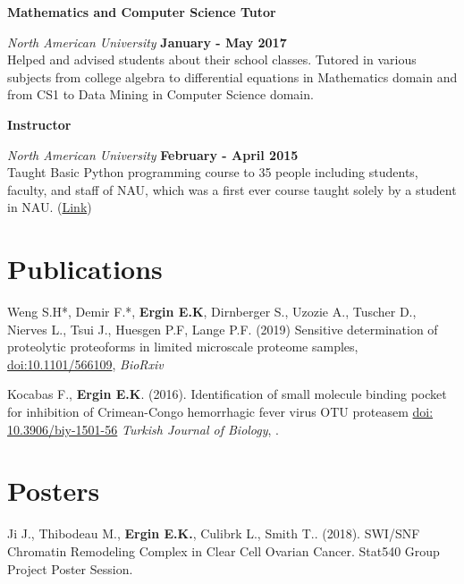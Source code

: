 \documentclass[margin,line]{res}
\begin{document}
\begin{resume}
{\bf Mathematics and Computer Science Tutor}
\vspace{-.1cm}

{\em North American University} \hfill {\bf January - May 2017}\\
Helped and advised students about their school classes. Tutored in various subjects from college algebra to differential equations in Mathematics domain and from CS1 to Data Mining in Computer Science domain.

{\bf Instructor}
\vspace{-.1cm}

{\em North American University} \hfill {\bf February - April 2015}\\
Taught Basic Python programming course to 35 people including students, faculty, and staff of NAU, which was a first ever course taught solely by a student in NAU. (\href{https://github.com/NAU-Python-Class/Py101-Spring-15}{Link})


\section{\sc Publications}
Weng S.H*, Demir F.*, {\bf Ergin E.K}, Dirnberger S., Uzozie A., Tuscher D., Nierves L., Tsui J., Huesgen P.F, Lange P.F. (2019) Sensitive determination of proteolytic proteoforms in limited microscale proteome samples, \href{https://doi.org/10.1101/566109}{doi:10.1101/566109}, {\em BioRxiv}

Kocabas F., {\bf Ergin E.K}. (2016). Identification of small molecule binding pocket for inhibition of Crimean-Congo hemorrhagic fever virus OTU proteasem \href{https://www.researchgate.net/profile/Fatih_Kocabas/publication/284188739_Identification_of_small_molecule_binding_pocket_for_inhibition_of_Crimean-Congo_hemorrhagic_fever_virus_OTU_protease/links/564f6a0b08aefe619b11de98.pdf}{doi: 10.3906/biy-1501-56} {\em Turkish Journal of Biology}, .

\section{\sc Posters}
Ji J., Thibodeau M., {\bf Ergin E.K.}, Culibrk L., Smith T.. (2018). SWI/SNF Chromatin Remodeling Complex in Clear Cell Ovarian Cancer. Stat540 Group Project Poster Session.

%


\end{resume}
\end{document}
